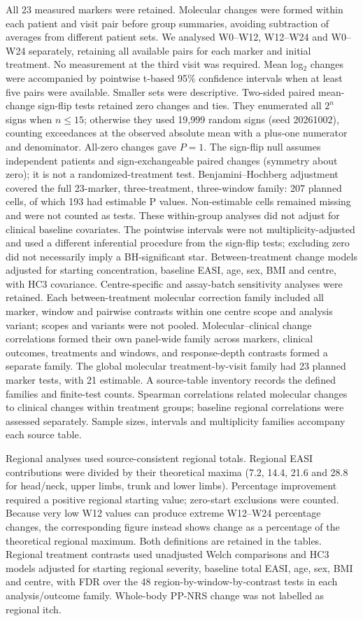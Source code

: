 \documentclass[10pt,a4paper]{article}
\begin{document}
All 23 measured markers were retained. Molecular changes were formed within each patient and visit pair before group summaries, avoiding subtraction of averages from different patient sets. We analysed W0--W12, W12--W24 and W0--W24 separately, retaining all available pairs for each marker and initial treatment. No measurement at the third visit was required. Mean log$_2$ changes were accompanied by pointwise t-based 95\% confidence intervals when at least five pairs were available. Smaller sets were descriptive. Two-sided paired mean-change sign-flip tests retained zero changes and ties. They enumerated all $2^n$ signs when $n\leq15$; otherwise they used 19,999 random signs (seed 20261002), counting exceedances at the observed absolute mean with a plus-one numerator and denominator. All-zero changes gave $P=1$. The sign-flip null assumes independent patients and sign-exchangeable paired changes (symmetry about zero); it is not a randomized-treatment test. Benjamini--Hochberg adjustment covered the full 23-marker, three-treatment, three-window family: 207 planned cells, of which 193 had estimable P values. Non-estimable cells remained missing and were not counted as tests. These within-group analyses did not adjust for clinical baseline covariates. The pointwise intervals were not multiplicity-adjusted and used a different inferential procedure from the sign-flip tests; excluding zero did not necessarily imply a BH-significant star. Between-treatment change models adjusted for starting concentration, baseline EASI, age, sex, BMI and centre, with HC3 covariance. Centre-specific and assay-batch sensitivity analyses were retained. Each between-treatment molecular correction family included all marker, window and pairwise contrasts within one centre scope and analysis variant; scopes and variants were not pooled. Molecular--clinical change correlations formed their own panel-wide family across markers, clinical outcomes, treatments and windows, and response-depth contrasts formed a separate family. The global molecular treatment-by-visit family had 23 planned marker tests, with 21 estimable. A source-table inventory records the defined families and finite-test counts. Spearman correlations related molecular changes to clinical changes within treatment groups; baseline regional correlations were assessed separately. Sample sizes, intervals and multiplicity families accompany each source table.

Regional analyses used source-consistent regional totals. Regional EASI contributions were divided by their theoretical maxima (7.2, 14.4, 21.6 and 28.8 for head/neck, upper limbs, trunk and lower limbs). Percentage improvement required a positive regional starting value; zero-start exclusions were counted. Because very low W12 values can produce extreme W12--W24 percentage changes, the corresponding figure instead shows change as a percentage of the theoretical regional maximum. Both definitions are retained in the tables. Regional treatment contrasts used unadjusted Welch comparisons and HC3 models adjusted for starting regional severity, baseline total EASI, age, sex, BMI and centre, with FDR over the 48 region-by-window-by-contrast tests in each analysis/outcome family. Whole-body PP-NRS change was not labelled as regional itch.
\end{document}
